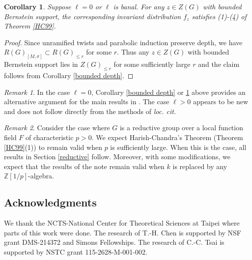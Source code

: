 \documentclass[12pt]{amsart}
\newtheorem{corollary}[thm]{Corollary}
\theoremstyle{definition}
\numberwithin{equation}{section}
\theoremstyle{remark}
\newtheorem{remark}{Remark}[section]
\begin{document}
\begin{corollary}\label{supp}\label{bounded support} Suppose $\ell=0$ or $\ell$ is banal. For any $z\in Z(G)$ with bounded Bernstein support, 
the corresponding invariant distribution 
$f_z$ satisfies 
(1)-(4) of Theorem \ref{HC99}.
\end{corollary}
\begin{proof}
Since unramified twists  and parabolic induction preserve depth,
we have 
$R(G)_{[M,\sigma]}\subset R(G)_{\leq r}$ for some $r$.
Thus any $z\in Z(G)$ with bounded Bernstein support lies in $Z(G)_{\leq r}$ for some sufficiently large $r$ and the claim follows from Corollary \ref{bounded depth}.
\end{proof}
\begin{remark}
    In the case $\ell=0$, Corollary \ref{bounded depth} or \ref{supp} above provides an alternative argument for the main results in \cite{MT02}. 
    The case $\ell>0$ appears to be new and does not follow directly from the methods of \emph{loc. cit.}
\end{remark}

\begin{remark}
Consider the case where $G$ is a reductive group over a local function field $F$ of characteristic $p>0$. We expect Harish-Chandra's Theorem (Theorem \ref{HC99}(1)) to remain valid when $p$ is sufficiently large. When this is the case, all results in Section \ref{reductive} follow. 
Moreover, with some modifications, we expect that the results of the note remain valid when $k$ is replaced by any $\mathbb Z[1/p]$-algebra.


\end{remark}

\subsection*{Acknowledgments} We thank the NCTS-National Center for Theoretical Sciences at Taipei where parts of this work were done. The research of T.-H. Chen is supported by NSF grant DMS-214372
and Simons Fellowships.
The research of C.-C. Tsai is supported by NSTC grant 115-2628-M-001-002.
\end{document}

